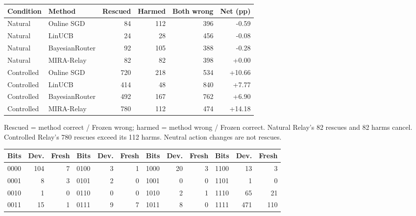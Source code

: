 \documentclass[10pt,letterpaper]{article}
\newcommand{\note}[1]{{\fontsize{8.5}{10.5}\selectfont #1\par}}
\newcommand{\sect}[1]{\vspace{5pt}{\large\bfseries #1}\par\vspace{2pt}}
\newenvironment{clean}{\begin{center}\fontsize{9.5}{11.5}\selectfont\setlength{\tabcolsep}{6pt}\renewcommand{\arraystretch}{1.06}}{\end{center}}
\begin{document}
\par\noindent\begin{minipage}{\linewidth}\end{minipage}\par
\begin{clean}\begin{tabular}{@{}llrrrr@{}}
\toprule
Condition & Method & Rescued & Harmed & Both wrong & Net (pp) \\
\midrule
Natural & Online SGD & 84 & 112 & 396 & -0.59 \\
Natural & LinUCB & 24 & 28 & 456 & -0.08 \\
Natural & BayesianRouter & 92 & 105 & 388 & -0.28 \\
Natural & MIRA-Relay & 82 & 82 & 398 & +0.00 \\
Controlled & Online SGD & 720 & 218 & 534 & +10.66 \\
Controlled & LinUCB & 414 & 48 & 840 & +7.77 \\
Controlled & BayesianRouter & 492 & 167 & 762 & +6.90 \\
Controlled & MIRA-Relay & 780 & 112 & 474 & +14.18 \\
\bottomrule\end{tabular}\end{clean}
\note{Rescued = method correct / Frozen wrong; harmed = method wrong / Frozen correct. Natural Relay's 82 rescues and 82 harms cancel. Controlled Relay's 780 rescues exceed its 112 harms. Neutral action changes are not rescues.}
\sect{Joint provider difficulty: preserve the actual dependence}
\par\noindent\begin{minipage}{\linewidth}\end{minipage}\par
\begin{clean}\begin{tabular}{@{}lrrlrrlrrlrr@{}}
\toprule
Bits & Dev. & Fresh & Bits & Dev. & Fresh & Bits & Dev. & Fresh & Bits & Dev. & Fresh \\
\midrule
0000 & 104 & 7 & 0100 & 3 & 1 & 1000 & 20 & 3 & 1100 & 13 & 3 \\
0001 & 8 & 3 & 0101 & 2 & 0 & 1001 & 0 & 0 & 1101 & 1 & 0 \\
0010 & 1 & 0 & 0110 & 0 & 0 & 1010 & 2 & 1 & 1110 & 65 & 21 \\
0011 & 15 & 1 & 0111 & 9 & 7 & 1011 & 8 & 0 & 1111 & 471 & 110 \\
\bottomrule\end{tabular}\end{clean}
\end{document}
